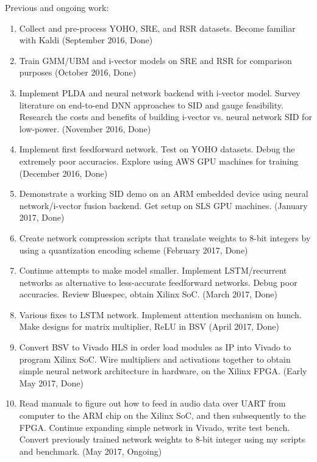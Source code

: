 \documentclass[journal,12pt,onecolumn,draftclsnofoot,]{sty/IEEEtran}
\begin{document}
Previous and ongoing work:
\begin{enumerate}
\item Collect and pre-process YOHO, SRE, and RSR datasets. Become familiar with Kaldi (September 2016, Done)
\item Train GMM/UBM and i-vector models on SRE and RSR for comparison purposes (October 2016, Done)
\item Implement PLDA and neural network backend with i-vector model. Survey literature on end-to-end DNN approaches to SID and gauge feasibility. Research the costs and benefits of building i-vector vs. neural network SID for low-power. (November 2016, Done)
\item Implement first feedforward network. Test on YOHO datasets. Debug the extremely poor accuracies. Explore using AWS GPU machines for training (December 2016, Done)
\item Demonstrate a working SID demo on an ARM embedded device using neural network/i-vector fusion backend. Get setup on SLS GPU machines.  (January 2017, Done)
\item Create network compression scripts that translate weights to 8-bit integers by using a quantization encoding scheme (February 2017, Done)
\item Continue attempts to make model smaller. Implement LSTM/recurrent networks as alternative to less-accurate feedforward networks. Debug poor accuracies. Review Bluespec, obtain Xilinx SoC. (March 2017, Done)
\item Various fixes to LSTM network. Implement attention mechanism on hunch. Make designs for matrix multiplier, ReLU in BSV (April 2017, Done)
\item Convert BSV to Vivado HLS in order load modules as IP into Vivado to program Xilinx SoC. Wire multipliers and activations together to obtain simple neural network architecture in hardware, on the Xilinx FPGA. (Early May 2017, Done)
\item Read manuals to figure out how to feed in audio data over UART from computer to the ARM chip on the Xilinx SoC, and then subsequently to the FPGA. Continue expanding simple network in Vivado, write test bench. Convert previously trained network weights to 8-bit integer using my scripts and benchmark. (May 2017, Ongoing)
\end{enumerate}
\end{document}
